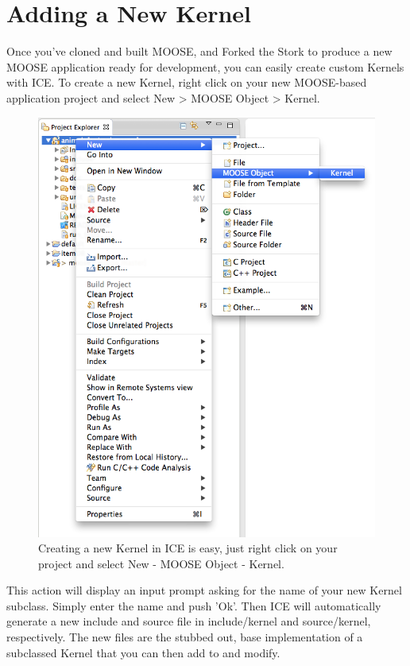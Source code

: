 \newpage

\section{Adding a New Kernel}\label{adding-a-new-kernel}

Once you've cloned and built MOOSE, and Forked the Stork to produce a
new MOOSE application ready for development, you can easily create
custom Kernels with ICE. To create a new Kernel, right click on your new
MOOSE-based application project and select New \textgreater{} MOOSE
Object \textgreater{} Kernel.

\begin{figure}[htbp]
\centering
\includegraphics[width=\textwidth]{figures/New_kernel.png}
\caption{Creating a new Kernel in ICE is easy, just right click on your project and select New - MOOSE Object - Kernel.}
\end{figure}

This action will display an input prompt asking for the name of your new
Kernel subclass. Simply enter the name and push 'Ok'. Then ICE will
automatically generate a new include and source file in include/kernel
and source/kernel, respectively. The new files are the stubbed out, base
implementation of a subclassed Kernel that you can then add to and
modify.

